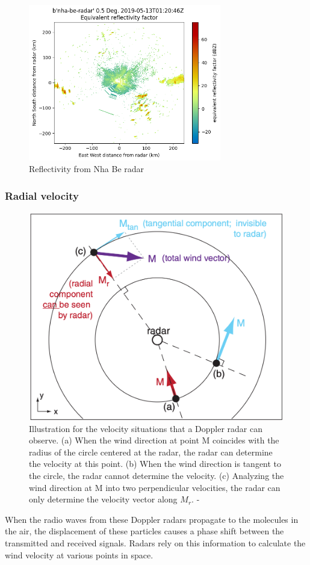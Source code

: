 \begin{figure}[H]
    \centering
    \includegraphics[width=0.75\textwidth]{Images/2.1-reflectivity_nhabe.png}
    \vspace{1em}
    \caption{Reflectivity from Nha Be radar}
    \label{fig:reflectivity-nhabe}
\end{figure}


\subsubsection{Radial velocity}

\begin{figure}[H]
    \centering
    \includegraphics[width=.55\textwidth]{Images/2.1-radial-velocity.png}
    \vspace{2em}
    \caption{Illustration for the velocity situations that a Doppler radar can observe. (a) When the wind direction at point M coincides with the radius of the circle centered at the radar, the radar can determine the velocity at this point. (b) When the wind direction is tangent to the circle, the radar cannot determine the velocity. (c) Analyzing the wind direction at M into two perpendicular velocities, the radar can only determine the velocity vector along $M_r$.  - \citet{2022Weather}}
    \label{fig:radial-velocity}
\end{figure}

When the radio waves from these Doppler radars propagate to the molecules in the air, the displacement of these particles causes a phase shift between the transmitted and received signals.
Radars rely on this information to calculate the wind velocity at various points in space.